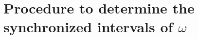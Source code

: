 %

\section{Procedure to determine the synchronized intervals of $\omega$}
\label{sec:capture_cluster}


